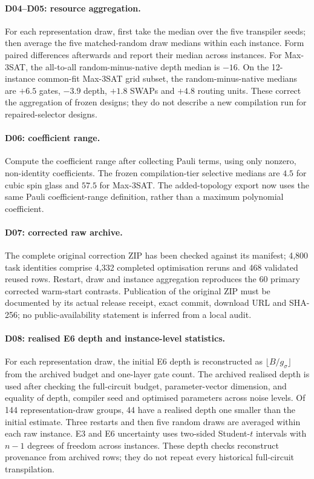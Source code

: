 \paragraph{D04--D05: resource aggregation.}
For each representation draw, first take the median over the five transpiler
seeds; then average the five matched-random draw medians within each instance.
Form paired differences afterwards and report their median across instances.
For Max-3SAT, the all-to-all random-minus-native depth median is $-16$.
On the 12-instance common-fit Max-3SAT grid subset, the random-minus-native
medians are $+6.5$ gates, $-3.9$ depth, $+1.8$ SWAPs and $+4.8$ routing units.
These correct the aggregation of frozen designs; they do not describe a new
compilation run for repaired-selector designs.

\paragraph{D06: coefficient range.}
Compute the coefficient range after collecting Pauli terms, using only
nonzero, non-identity coefficients. The frozen compilation-tier selective
medians are $4.5$ for cubic spin glass and $57.5$ for Max-3SAT. The
added-topology export now uses the same Pauli coefficient-range definition,
rather than a maximum polynomial coefficient.

\paragraph{D07: corrected raw archive.}
The complete original correction ZIP has been checked against its manifest;
4,800 task identities comprise 4,332 completed optimisation reruns and 468
validated reused rows. Restart, draw and instance aggregation reproduces the
60 primary corrected warm-start contrasts. Publication of the original ZIP
must be documented by its actual release receipt, exact commit, download URL
and SHA-256; no public-availability statement is inferred from a local audit.

\paragraph{D08: realised E6 depth and instance-level statistics.}
For each representation draw, the initial E6 depth is reconstructed as
$\lfloor B/g_\sigma\rfloor$ from the archived budget and one-layer gate count.
The archived realised depth is used after checking the full-circuit budget,
parameter-vector dimension, and equality of depth, compiler seed and optimised
parameters across noise levels. Of 144 representation-draw groups, 44 have a
realised depth one smaller than the initial estimate. Three restarts and then
five random draws are averaged within each raw instance. E3 and E6 uncertainty
uses two-sided Student-$t$ intervals with $n-1$ degrees of freedom across
instances. These depth checks reconstruct provenance from archived rows;
they do not repeat every historical full-circuit transpilation.

